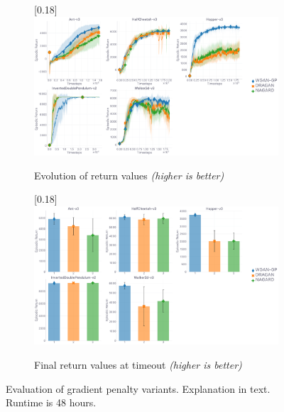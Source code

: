 \begin{figure}
  \center
  \begin{subfigure}[t]{0.99\textwidth}
    \center\scalebox{0.18}[0.18]{\includegraphics{Plots/fig07_gp_vars_5envs/plots_eval_env_ret_plot.pdf}}
    \caption{Evolution of return values \textit{(higher is better)}}
  \end{subfigure}
  \begin{subfigure}[t]{0.99\textwidth}
    \center\scalebox{0.18}[0.18]{\includegraphics{Plots/fig07_gp_vars_5envs/plots_eval_env_ret_barplot.pdf}}
    \caption{Final return values at timeout \textit{(higher is better)}}
  \end{subfigure}
  \caption{
  Evaluation of gradient penalty variants.
  Explanation in text.
  Runtime is 48 hours.}
  \label{penvariantsplots}
\end{figure}

